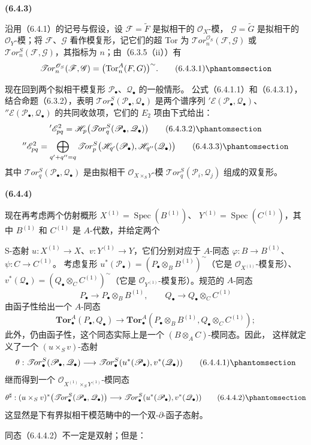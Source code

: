 \documentclass[UTF8,fontset=none,11pt,oneside,openany]{ctexbook}
\newenvironment{env}[1][]{%
  \par\medskip\noindent\textbf{(#1)}\ %
}{\par}
\newcommand{\oldpage}[2][]{%
  \hypertarget{ega-source-page-#1-#2}{}%
  \marginnote{\scriptsize\textbf{#1}~|~#2}\ignorespaces}
\let\EGAOriginalLabel\label
\renewcommand{\label}[1]{\phantomsection\EGAOriginalLabel{#1}}
\begin{document}
\begin{env}[6.4.3]
沿用（6.4.1）的记号与假设，设
$\mathscr F=\widetilde F$ 是拟相干的 $\mathscr O_X$-模，
$\mathscr G=\widetilde G$ 是拟相干的 $\mathscr O_Y$-模；将
$\mathscr F$、$\mathscr G$ 看作模复形，记它们的超 Tor 为
$\mathscr{T}\!or_n^{\mathscr O_S}(\mathscr F,\mathscr G)$ 或
$\mathscr{T}\!or_n^S(\mathscr F,\mathscr G)$，其指标为 $n$；由（6.3.5（ii））有
\[
  \mathscr{T}\!or_n^{\mathscr O_S}(\mathscr F,\mathscr G)
  =\bigl(\operatorname{Tor}_n^A(F,G)\bigr)^{\sim}.
  \tag{6.4.3.1}\label{III.6.4.3.1-fr}
\]

现在回到两个拟相干模复形 $\mathscr P_\bullet$、$\mathscr Q_\bullet$ 的一般情形。
公式（6.4.1.1）和（6.4.3.1），结合命题（6.3.2），表明
$\mathscr{T}\!or_\bullet^S(\mathscr P_\bullet,\mathscr Q_\bullet)$ 是两个谱序列
$'\mathscr E(\mathscr P_\bullet,\mathscr Q_\bullet)$、
$''\mathscr E(\mathscr P_\bullet,\mathscr Q_\bullet)$ 的共同收敛项，它们的
$E_2$ 项由下式给出：
\[
  '\mathscr E_{pq}^2
  =\mathscr H_p\bigl(\mathscr{T}\!or_q^S
    (\mathscr P_\bullet,\mathscr Q_\bullet)\bigr)
  \tag{6.4.3.2}\label{III.6.4.3.2-fr}
\]
\[
  ''\mathscr E_{pq}^2
  =\bigoplus_{q'+q''=q}
  \mathscr{T}\!or_p^S
  \bigl(\mathscr H_{q'}(\mathscr P_\bullet),
        \mathscr H_{q''}(\mathscr Q_\bullet)\bigr)
  \tag{6.4.3.3}\label{III.6.4.3.3-fr}
\]
其中 $\mathscr{T}\!or_q^S(\mathscr P_\bullet,\mathscr Q_\bullet)$ 是由拟相干
$\mathscr O_{X\times_S Y}$-模
$\mathscr{T}\!or_q^S(\mathscr P_i,\mathscr Q_j)$ 组成的双复形。
\end{env}

\begin{env}[6.4.4]
现在再考虑两个仿射概形
$X^{(1)}=\operatorname{Spec}(B^{(1)})$、
$Y^{(1)}=\operatorname{Spec}(C^{(1)})$，其中 $B^{(1)}$ 和 $C^{(1)}$ 是
$A$-代数，并给定两个

\oldpage[III]{147}
S-态射 $u:X^{(1)}\to X$、$v:Y^{(1)}\to Y$，它们分别对应于
$A$-同态 $\varphi:B\to B^{(1)}$、$\psi:C\to C^{(1)}$。
考虑复形
$u^*(\mathscr P_\bullet)=(P_\bullet\otimes_B B^{(1)})^{\sim}$（它是
$\mathscr O_{X^{(1)}}$-模复形）、
$v^*(\mathscr Q_\bullet)=(Q_\bullet\otimes_C C^{(1)})^{\sim}$（它是
$\mathscr O_{Y^{(1)}}$-模复形）。规范的 $A$-同态
\[
  P_\bullet\longrightarrow P_\bullet\otimes_B B^{(1)},
  \qquad
  Q_\bullet\longrightarrow Q_\bullet\otimes_C C^{(1)}
\]
由函子性给出一个 $A$-同态
\[
  \mathbf{Tor}_\bullet^A(P_\bullet,Q_\bullet)
  \longrightarrow
  \mathbf{Tor}_\bullet^A
  (P_\bullet\otimes_B B^{(1)},Q_\bullet\otimes_C C^{(1)});
\]
此外，仍由函子性，这个同态实际上是一个 $(B\otimes_A C)$-模同态。因此，
这样就定义了一个 $(u\times_S v)$-态射
\[
  \theta:\mathscr{T}\!or_\bullet^S(\mathscr P_\bullet,\mathscr Q_\bullet)
  \longrightarrow
  \mathscr{T}\!or_\bullet^S
  (u^*(\mathscr P_\bullet),v^*(\mathscr Q_\bullet))
  \tag{6.4.4.1}\label{III.6.4.4.1-fr}
\]
继而得到一个 $\mathscr O_{X^{(1)}\times_S Y^{(1)}}$-模同态
\[
  \theta^\sharp:(u\times_S v)^*
  \bigl(\mathscr{T}\!or_\bullet^S(\mathscr P_\bullet,\mathscr Q_\bullet)\bigr)
  \longrightarrow
  \mathscr{T}\!or_\bullet^S
  (u^*(\mathscr P_\bullet),v^*(\mathscr Q_\bullet))
  \tag{6.4.4.2}\label{III.6.4.4.2-fr}
\]
这显然是下有界拟相干模范畴中的一个双-$\partial$-函子态射。

同态（6.4.4.2）不一定是双射；但是：
\end{env}
\end{document}
